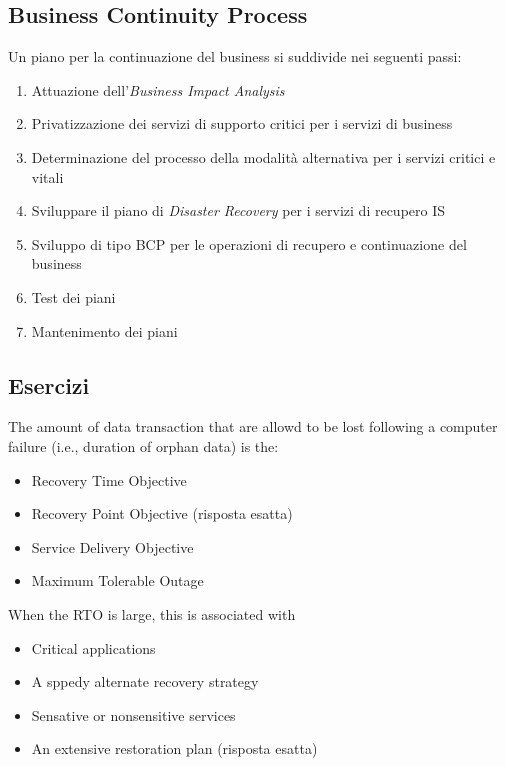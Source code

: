 \subsection{Business Continuity Process}

Un piano per la continuazione del business si suddivide nei seguenti passi:
\begin{enumerate}
  \item Attuazione dell'\textit{Business Impact Analysis}
  \item Privatizzazione dei servizi di supporto critici per i servizi di 
  business
  \item Determinazione del processo della modalità alternativa per i servizi 
  critici e vitali
  \item Sviluppare il piano di \textit{Disaster Recovery} per i servizi di 
  recupero IS
  \item Sviluppo di tipo BCP per le operazioni di recupero e continuazione del 
  business
  \item Test dei piani
  \item Mantenimento dei piani
\end{enumerate}

\subsection{Esercizi}

The amount of data transaction that are allowd to be lost following a computer 
failure (i.e., duration of orphan data) is the:
\begin{itemize}
  \item Recovery Time Objective
  \item Recovery Point Objective (risposta esatta)
  \item Service Delivery Objective
  \item Maximum Tolerable Outage
\end{itemize}


When the RTO is large, this is associated with
\begin{itemize}
  \item Critical applications
  \item A sppedy alternate recovery strategy
  \item Sensative or nonsensitive services
  \item An extensive restoration plan (risposta esatta)
\end{itemize}

